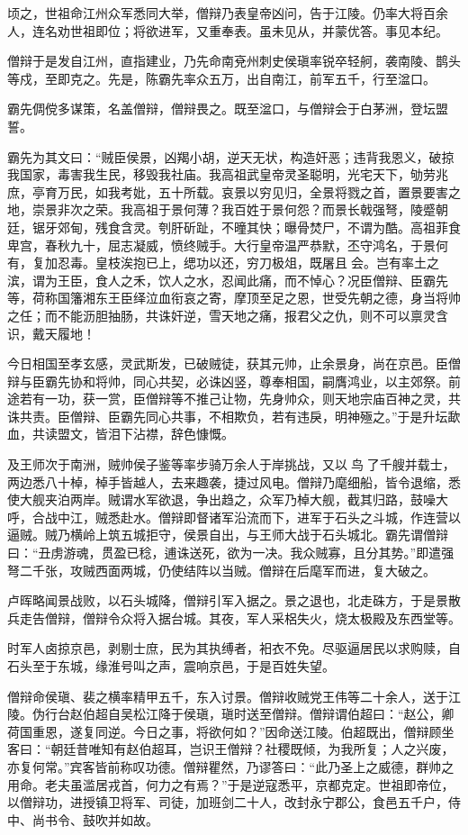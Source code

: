 \documentclass[12pt,UTF8]{ctexbook}
\begin{document}
顷之，世祖命江州众军悉同大举，僧辩乃表皇帝凶问，告于江陵。仍率大将百余人，连名劝世祖即位；将欲进军，又重奉表。虽未见从，并蒙优答。事见本纪。

僧辩于是发自江州，直指建业，乃先命南兗州刺史侯瑱率锐卒轻舸，袭南陵、鹊头等戍，至即克之。先是，陈霸先率众五万，出自南江，前军五千，行至湓口。

霸先倜傥多谋策，名盖僧辩，僧辩畏之。既至湓口，与僧辩会于白茅洲，登坛盟誓。

霸先为其文曰：“贼臣侯景，凶羯小胡，逆天无状，构造奸恶；违背我恩义，破掠我国家，毒害我生民，移毁我社庙。我高祖武皇帝灵圣聪明，光宅天下，劬劳兆庶，亭育万民，如我考妣，五十所载。哀景以穷见归，全景将戮之首，置景要害之地，崇景非次之荣。我高祖于景何薄？我百姓于景何怨？而景长戟强弩，陵蹙朝廷，锯牙郊甸，残食含灵。刳肝斫趾，不曈其快；曝骨焚尸，不谓为酷。高祖菲食卑宫，春秋九十，屈志凝威，愤终贼手。大行皇帝温严恭默，丕守鸿名，于景何有，复加忍毒。皇枝涘抱已上，缌功以还，穷刀极俎，既屠且会。岂有率土之滨，谓为王臣，食人之禾，饮人之水，忍闻此痛，而不悼心？况臣僧辩、臣霸先等，荷称国籓湘东王臣绎泣血衔哀之寄，摩顶至足之恩，世受先朝之德，身当将帅之任；而不能沥胆抽肠，共诛奸逆，雪天地之痛，报君父之仇，则不可以禀灵含识，戴天履地！

今日相国至孝玄感，灵武斯发，已破贼徒，获其元帅，止余景身，尚在京邑。臣僧辩与臣霸先协和将帅，同心共契，必诛凶竖，尊奉相国，嗣膺鸿业，以主郊祭。前途若有一功，获一赏，臣僧辩等不推己让物，先身帅众，则天地宗庙百神之灵，共诛共责。臣僧辩、臣霸先同心共事，不相欺负，若有违戾，明神殛之。”于是升坛歃血，共读盟文，皆泪下沾襟，辞色慷慨。

及王师次于南洲，贼帅侯子鉴等率步骑万余人于岸挑战，又以鸟了千艘并载士，两边悉八十棹，棹手皆越人，去来趣袭，捷过风电。僧辩乃麾细船，皆令退缩，悉使大舰夹泊两岸。贼谓水军欲退，争出趋之，众军乃棹大舰，截其归路，鼓噪大呼，合战中江，贼悉赴水。僧辩即督诸军沿流而下，进军于石头之斗城，作连营以逼贼。贼乃横岭上筑五城拒守，侯景自出，与王师大战于石头城北。霸先谓僧辩曰：“丑虏游魂，贯盈已稔，逋诛送死，欲为一决。我众贼寡，且分其势。”即遣强弩二千张，攻贼西面两城，仍使结阵以当贼。僧辩在后麾军而进，复大破之。

卢晖略闻景战败，以石头城降，僧辩引军入据之。景之退也，北走硃方，于是景散兵走告僧辩，僧辩令众将入据台城。其夜，军人采梠失火，烧太极殿及东西堂等。

时军人卤掠京邑，剥剔士庶，民为其执缚者，衵衣不免。尽驱逼居民以求购赎，自石头至于东城，缘淮号叫之声，震响京邑，于是百姓失望。

僧辩命侯瑱、裴之横率精甲五千，东入讨景。僧辩收贼党王伟等二十余人，送于江陵。伪行台赵伯超自吴松江降于侯瑱，瑱时送至僧辩。僧辩谓伯超曰：“赵公，卿荷国重恩，遂复同逆。今日之事，将欲何如？”因命送江陵。伯超既出，僧辩顾坐客曰：“朝廷昔唯知有赵伯超耳，岂识王僧辩？社稷既倾，为我所复；人之兴废，亦复何常。”宾客皆前称叹功德。僧辩瞿然，乃谬答曰：“此乃圣上之威德，群帅之用命。老夫虽滥居戎首，何力之有焉？”于是逆寇悉平，京都克定。世祖即帝位，以僧辩功，进授镇卫将军、司徒，加班剑二十人，改封永宁郡公，食邑五千户，侍中、尚书令、鼓吹并如故。
\end{document}
